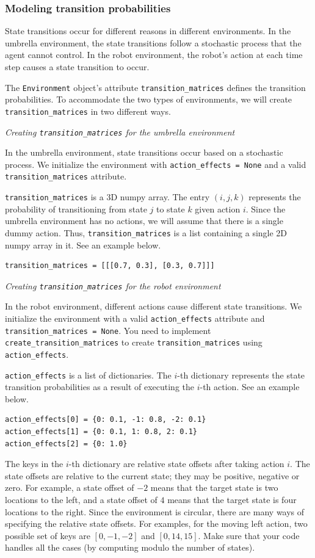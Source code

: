 \documentclass[12pt]{article}
\begin{document}
\subsubsection{Modeling transition probabilities}

State transitions occur for different reasons in different environments. In the umbrella environment, the state transitions follow a stochastic process that the agent cannot control. In the robot environment, the robot's action at each time step causes a state transition to occur. 

The \verb+Environment+ object's attribute \verb+transition_matrices+ defines the transition probabilities. To accommodate the two types of environments, we will create \verb+transition_matrices+ in two different ways.

{\em Creating \verb+transition_matrices+ for the umbrella environment}

In the umbrella environment, state transitions occur based on a stochastic process. We initialize the environment with \verb+action_effects = None+ and a valid \verb+transition_matrices+ attribute.

\verb+transition_matrices+ is a 3D numpy array. The entry $(i,j,k)$ represents the probability of transitioning from state $j$ to state $k$ given action $i$. Since the umbrella environment has no actions, we will assume that there is a single dummy action. Thus, \verb+transition_matrices+ is a list containing a single 2D numpy array in it. See an example below.

\begin{verbatim}
transition_matrices = [[[0.7, 0.3], [0.3, 0.7]]]
\end{verbatim}

{\em Creating \verb+transition_matrices+ for the robot environment}

In the robot environment, different actions cause different state transitions. We initialize the environment with a valid \verb+action_effects+ attribute and \verb+transition_matrices = None+. You need to implement \verb+create_transition_matrices+ to create \verb+transition_matrices+ using \verb+action_effects+.

\verb+action_effects+ is a list of dictionaries. The $i$-th dictionary represents the state transition probabilities as a result of executing the $i$-th action. See an example below.
%
\begin{verbatim}
action_effects[0] = {0: 0.1, -1: 0.8, -2: 0.1}
action_effects[1] = {0: 0.1, 1: 0.8, 2: 0.1}
action_effects[2] = {0: 1.0}
\end{verbatim}
%
The keys in the $i$-th dictionary are relative state offsets after taking action $i$. The state offsets are relative to the current state; they may be positive, negative or zero. For example, a state offset of $-2$ means that the target state is two locations to the left, and a state offset of $4$ means that the target state is four locations to the right. Since the environment is circular, there are many ways of specifying the relative state offsets. For examples, for the moving left action, two possible set of keys are $[0, -1, -2]$ and $[0, 14, 15]$. Make sure that your code handles all the cases (by computing modulo the number of states).
\end{document}
